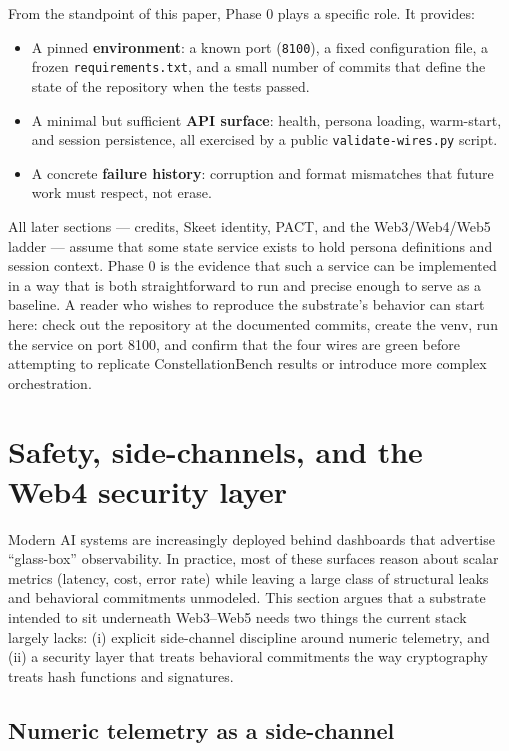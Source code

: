 From the standpoint of this paper, Phase 0 plays a specific role. It
provides:

\begin{itemize}
\tightlist
\item
  A pinned \textbf{environment}: a known port (\texttt{8100}), a fixed
  configuration file, a frozen \texttt{requirements.txt}, and a small
  number of commits that define the state of the repository when the
  tests passed.
\item
  A minimal but sufficient \textbf{API surface}: health, persona
  loading, warm-start, and session persistence, all exercised by a
  public \texttt{validate-wires.py} script.
\item
  A concrete \textbf{failure history}: corruption and format mismatches
  that future work must respect, not erase.
\end{itemize}

All later sections --- credits, Skeet identity, PACT, and the
Web3/Web4/Web5 ladder --- assume that some state service exists to hold
persona definitions and session context. Phase 0 is the evidence that
such a service can be implemented in a way that is both straightforward
to run and precise enough to serve as a baseline. A reader who wishes to
reproduce the substrate's behavior can start here: check out the
repository at the documented commits, create the venv, run the service
on port 8100, and confirm that the four wires are green before
attempting to replicate ConstellationBench results or introduce more
complex orchestration.

\section{Safety, side-channels, and the Web4 security
layer}\label{safety-side-channels-and-the-web4-security-layer}

Modern AI systems are increasingly deployed behind dashboards that
advertise ``glass-box'' observability. In practice, most of these
surfaces reason about scalar metrics (latency, cost, error rate) while
leaving a large class of structural leaks and behavioral commitments
unmodeled. This section argues that a substrate intended to sit
underneath Web3--Web5 needs two things the current stack largely lacks:
(i) explicit side-channel discipline around numeric telemetry, and (ii)
a security layer that treats behavioral commitments the way cryptography
treats hash functions and signatures.

\subsection{Numeric telemetry as a
side-channel}\label{numeric-telemetry-as-a-side-channel}

